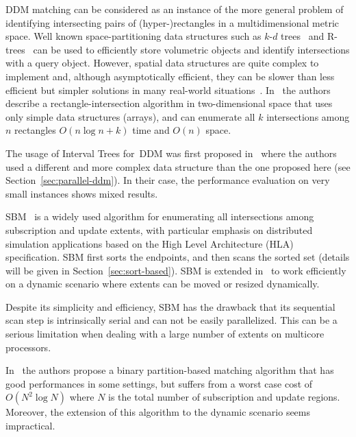 \documentclass[10pt, conference, compsocconf]{IEEEtran}
\begin{document}
\ac{DDM} matching can be considered as an instance of the more general
problem of identifying intersecting pairs of (hyper-)rectangles in a
multidimensional metric space. Well known space-partitioning data
structures such as $k$-$d$ trees~\cite{Rosenberg1985} and
R-trees~\cite{Guttman1984} can be used to efficiently store volumetric
objects and identify intersections with a query object. However,
spatial data structures are quite complex to implement and, although
asymptotically efficient, they can be slower than less efficient but
simpler solutions in many real-world situations~\cite{petty-1997}.
In~\cite{Devai2010} the authors describe a rectangle-intersection
algorithm in two-dimensional space that uses only simple data
structures (arrays), and can enumerate all $k$ intersections among $n$
rectangles $O(n \log n + k)$ time and $O(n)$ space.

The usage of Interval Trees for~\ac{DDM} was first proposed
in~\cite{petty-1997} where the authors used a different and more
complex data structure than the one proposed here (see
Section~\ref{sec:parallel-ddm}). In their case, the performance
evaluation on very small instances shows mixed results.

\ac{SBM}~\cite{Raczy2005} is a widely used algorithm for enumerating
all intersections among subscription and update extents, with
particular emphasis on distributed simulation applications based on
the High Level Architecture (HLA) specification. \ac{SBM} first sorts
the endpoints, and then scans the sorted set (details will be given in
Section~\ref{sec:sort-based}). \ac{SBM} is extended in~\cite{Pan2011}
to work efficiently on a dynamic scenario where extents can be moved
or resized dynamically.

Despite its simplicity and efficiency, \ac{SBM} has the drawback that
its sequential scan step is intrinsically serial and can not be easily
parallelized. This can be a serious limitation when dealing with a
large number of extents on multicore processors.

In~\cite{6147978} the authors propose a binary partition-based
matching algorithm that has good performances in some settings, but
suffers from a worst case cost of $O(N^2\log N)$ where $N$ is the
total number of subscription and update regions. Moreover, the
extension of this algorithm to the dynamic scenario seems impractical.
\end{document}
